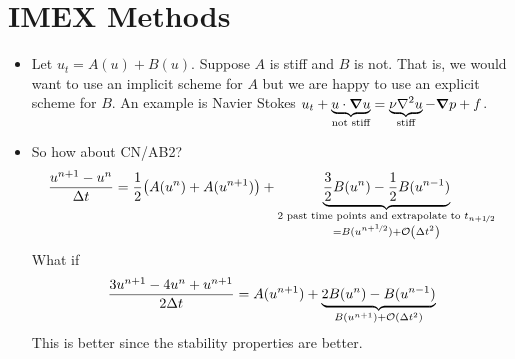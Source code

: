\documentclass{article}
\newcommand{\half}{\nicefrac{1}{2}}
\newcommand{\Dt}{\Delta t}
\begin{document}
    \section{IMEX Methods}
        \begin{itemize}
            \item Let $u_t = A(u) + B(u)$.  Suppose $A$ is stiff and $B$ is not.  That is, we would want to use an implicit scheme for $A$ but we are happy to use an explicit scheme for $B$.  An example is Navier Stokes $u_t + \underbrace{u\cdot\grad u}_\text{not stiff} = \underbrace{\nu\laplacian u}_\text{stiff} - \grad p + f$.
            \item So how about CN/AB2?
            \begin{align*}
                \frac{u^{n+1} - u^n}{\Dt} = \frac{1}{2}\qty(A(u^n) + A(u^{n+1})) + \underbrace{\frac{3}{2}B(u^n) - \frac{1}{2}B(u^{n-1})}_{\substack{\text{2 past time points and extrapolate to $t_{n+\half}$}\\= B(u^{n+\half}) + \order{\Dt^2}}}
            \end{align*}
            What if
            \begin{align*}
                \frac{3u^{n+1} - 4u^{n} + u^{n+1}}{2\Dt} = A(u^{n+1}) + \underbrace{2B(u^n) - B(u^{n-1})}_{B(u^{n+1}) + \order{\Dt^2}}
            \end{align*}
            This is better since the stability properties are better.
        \end{itemize}
\end{document}
